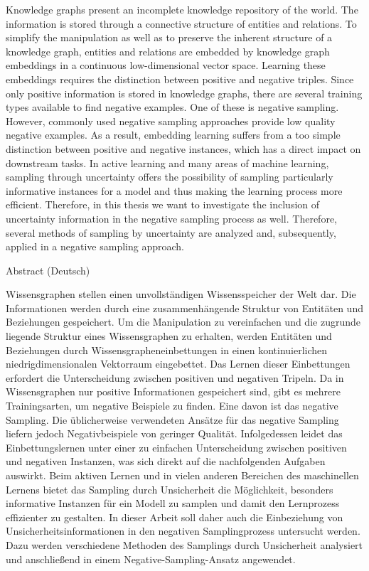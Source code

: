 %
\label{sec:abstract}

Knowledge graphs present an incomplete knowledge repository of the world.
The information is stored through a connective structure of entities and relations.
To simplify the manipulation as well as to preserve the inherent structure of a knowledge graph, entities and relations are embedded by knowledge graph embeddings in a continuous low-dimensional vector space.
Learning these embeddings requires the distinction between positive and negative triples.
Since only positive information is stored in knowledge graphs, 
there are several training types available to find negative examples.
One of these is negative sampling. 
However, commonly used negative sampling approaches provide low quality negative examples.
As a result, embedding learning suffers from a too simple distinction between positive and negative instances, which has a direct impact on downstream tasks.
In active learning and many areas of machine learning, sampling through uncertainty offers the possibility of sampling particularly informative instances for a model and thus making the learning process more efficient.
Therefore, in this thesis we want to investigate the inclusion of uncertainty information in the negative sampling process as well.
Therefore, several methods of sampling by uncertainty are analyzed and, subsequently, applied in a negative sampling approach.

\vspace*{20mm}

{Abstract (Deutsch)}
\label{sec:abstract-german}

Wissensgraphen stellen einen unvollständigen Wissensspeicher der Welt dar.
Die Informationen werden durch eine zusammenhängende Struktur von Entitäten und Beziehungen gespeichert.
Um die Manipulation zu vereinfachen und die zugrunde liegende  Struktur eines Wissensgraphen zu erhalten, werden Entitäten und Beziehungen durch Wissensgrapheneinbettungen in einen kontinuierlichen niedrigdimensionalen Vektorraum eingebettet.
Das Lernen dieser Einbettungen erfordert die Unterscheidung zwischen positiven und negativen Tripeln.
Da in Wissensgraphen nur positive Informationen gespeichert sind, gibt es mehrere Trainingsarten, um negative Beispiele zu finden.
Eine davon ist das negative Sampling. 
Die üblicherweise verwendeten Ansätze für das negative Sampling liefern jedoch Negativbeispiele von geringer Qualität.
Infolgedessen leidet das Einbettungslernen unter einer zu einfachen Unterscheidung zwischen positiven und negativen Instanzen, was sich direkt auf die nachfolgenden Aufgaben auswirkt.
Beim aktiven Lernen und in vielen anderen Bereichen des maschinellen Lernens bietet das Sampling durch Unsicherheit die Möglichkeit, besonders informative Instanzen für ein Modell zu samplen und damit den Lernprozess effizienter zu gestalten.
In dieser Arbeit soll daher auch die Einbeziehung von Unsicherheitsinformationen in den negativen Samplingprozess untersucht werden.
Dazu werden verschiedene Methoden des Samplings durch Unsicherheit analysiert und anschließend in einem Negative-Sampling-Ansatz angewendet.

